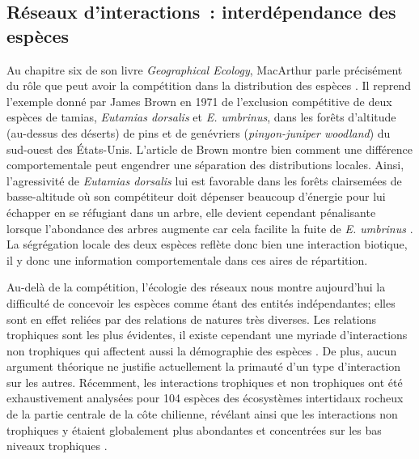 \subsection*{Réseaux d'interactions~: interdépendance des
espèces}\label{ruxe9seaux-dinteractions-interduxe9pendance-des-espuxe8ces}

Au chapitre six de son livre \emph{Geographical Ecology}, MacArthur
parle précisément du rôle que peut avoir la compétition dans la
distribution des espèces \citep{macarthur1972geographical}. Il reprend
l'exemple donné par James Brown en 1971 de l'exclusion compétitive de
deux espèces de tamias, \emph{Eutamias dorsalis} et \emph{E. umbrinus},
dans les forêts d'altitude (au-dessus des déserts) de pins et de
genévriers (\emph{pinyon-juniper woodland}) du sud-ouest des États-Unis.
L'article de Brown montre bien comment une différence comportementale
peut engendrer une séparation des distributions locales. Ainsi,
l'agressivité de \emph{Eutamias dorsalis} lui est favorable dans les
forêts clairsemées de basse-altitude où son compétiteur doit dépenser
beaucoup d'énergie pour lui échapper en se réfugiant dans un arbre, elle
devient cependant pénalisante lorsque l'abondance des arbres augmente
car cela facilite la fuite de \emph{E. umbrinus} \citep{Brown1971}. La
ségrégation locale des deux espèces reflète donc bien une interaction
biotique, il y donc une information comportementale dans ces aires de
répartition.

Au-delà de la compétition, l'écologie des réseaux nous montre
aujourd'hui la difficulté de concevoir les espèces comme étant des
entités indépendantes; elles sont en effet reliées par des relations de
natures très diverses. Les relations trophiques sont les plus évidentes,
il existe cependant une myriade d'interactions non trophiques qui
affectent aussi la démographie des espèces \citep[voir][ pour une
réflexion sur le sujet et une classification de ces
interactions]{Kefi2012}. De plus, aucun argument théorique ne justifie
actuellement la primauté d'un type d'interaction sur les autres.
Récemment, les interactions trophiques et non trophiques ont été
exhaustivement analysées pour 104 espèces des écosystèmes intertidaux
rocheux de la partie centrale de la côte chilienne, révélant ainsi que
les interactions non trophiques y étaient globalement plus abondantes et
concentrées sur les bas niveaux trophiques \citep{Kefi2015}.

